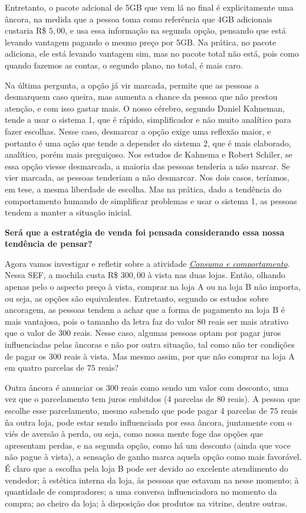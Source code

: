 Entretanto, o pacote adcional de 5GB que vem lá no final é explicitamente uma âncora, na medida que a pessoa toma como referência que 4GB adicionais custaria R\$ $5{,}00$, e usa essa informação na segunda opção, pensando que está levando vantagem pagando o mesmo preço por 5GB. Na prática, no pacote adiciona, ele está levando vantagem sim, mas no pacote total não está, pois como quando fazemos as contas, o segundo plano, no total, é mais caro.

Na última pergunta, a opção já vir marcada, permite que as pessoas a desmarquem caso queira, mas aumenta a chance da pessoa que não prestou atenção, e com isso gastar mais. O nosso cérebro, segundo Daniel Kahneman, tende a usar o sistema 1, que é rápido, simplificador e não muito analítico para fazer escolhas. Nesse caso, desmarcar a opção exige uma reflexão maior, e portanto é uma ação que tende a depender do sistema 2, que é mais elaborado, analítico, porém mais preguiçoso. Nos estudos de Kahnema e Robert Schiler, se essa opção viesse desmarcada, a maioria das pessoas tenderia a não marcar. Se vier marcada, as pessoas tenderiam a não desmarcar. Nos dois casos, teríamos, em tese, a mesma liberdade de escolha. Mas na prática, dado a tendência do comportamento humando de simplificar problemas e usar o sistema 1, as pessoas tendem a manter a situação inicial.

 \textbf{Será que a estratégia de venda foi pensada considerando essa nossa tendência de pensar?}

Agora vamos investigar e refletir sobre a atividade \hyperref[fin-ativ-38]{\textit{Consumo e comportamento}}. Nessa SEF, a mochila custa R\$ $300{,}00$ à vista nas duas lojas. Então, olhando apenas pelo o aspecto preço à vista, comprar na loja A ou na loja B não importa, ou seja, as opções são equivalentes. Entretanto, segundo os estudos sobre ancoragem, as pessoas tendem a achar que a forma de pagamento na loja B é mais vantajosa, pois o tamanho da letra faz do valor $80$ reais ser mais atrativo que o valor de 300 reais. Nesse caso, algumas pessoas optam por pagar juros influenciadas pelas âncoras e não por outra situação, tal como não ter condições de pagar os 300 reais à vista. Mas mesmo assim, por que não comprar na loja A em quatro parcelas de $75$ reais?

Outra âncora é anunciar os $300$ reais como sendo um valor com desconto, uma vez que o parcelamento tem juros embitdos (4 parcelas de $80$ reais). A pessoa que escolhe esse parcelamento, mesmo sabendo que pode pagar 4 parcelas de $75$ reais ña outra loja, pode estar sendo influenciada por essa âncora, juntamente com o viés de aversão à perda, ou seja, como nossa mente foge das opções que apresentam perdas, e na segunda opção, como há um desconto (ainda que voce não pague à vista), a sensação de ganho marca aquela opção como mais favorável. É claro que a escolha pela loja B pode ser devido ao excelente atendimento do vendedor; à estética interna da loja, às pessoas que estavam na nesse momento; à quantidade de compradores; a uma conversa influenciadora no momento da compra; ao cheiro da loja; à disposição dos produtos na vitrine, dentre outras.

